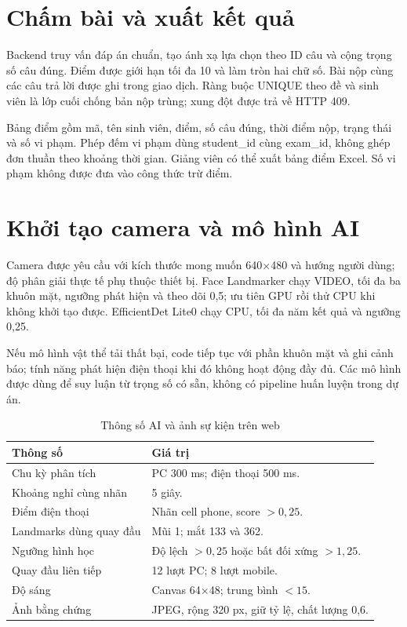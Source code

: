 \section{Chấm bài và xuất kết quả}
Backend truy vấn đáp án chuẩn, tạo ánh xạ lựa chọn theo ID câu và cộng trọng số câu đúng. Điểm được giới hạn tối đa 10 và làm tròn hai chữ số. Bài nộp cùng các câu trả lời được ghi trong giao dịch. Ràng buộc UNIQUE theo đề và sinh viên là lớp cuối chống bản nộp trùng; xung đột được trả về HTTP 409.

Bảng điểm gồm mã, tên sinh viên, điểm, số câu đúng, thời điểm nộp, trạng thái và số vi phạm. Phép đếm vi phạm dùng student\_id cùng exam\_id, không ghép đơn thuần theo khoảng thời gian. Giảng viên có thể xuất bảng điểm Excel. Số vi phạm không được đưa vào công thức trừ điểm.

\section{Khởi tạo camera và mô hình AI}
Camera được yêu cầu với kích thước mong muốn 640$\times$480 và hướng người dùng; độ phân giải thực tế phụ thuộc thiết bị. Face Landmarker chạy VIDEO, tối đa ba khuôn mặt, ngưỡng phát hiện và theo dõi 0,5; ưu tiên GPU rồi thử CPU khi không khởi tạo được. EfficientDet Lite0 chạy CPU, tối đa năm kết quả và ngưỡng 0,25.

Nếu mô hình vật thể tải thất bại, code tiếp tục với phần khuôn mặt và ghi cảnh báo; tính năng phát hiện điện thoại khi đó không hoạt động đầy đủ. Các mô hình được dùng để suy luận từ trọng số có sẵn, không có pipeline huấn luyện trong dự án.

\begin{table}[htbp]\centering
\caption{Thông số AI và ảnh sự kiện trên web}
\begin{tabularx}{\textwidth}{@{}L{6cm}X@{}}\toprule
Thông số & Giá trị \\\midrule
Chu kỳ phân tích & PC 300 ms; điện thoại 500 ms.\\
Khoảng nghỉ cùng nhãn & 5 giây.\\
Điểm điện thoại & Nhãn cell phone, score $>0{,}25$.\\
Landmarks dùng quay đầu & Mũi 1; mắt 133 và 362.\\
Ngưỡng hình học & Độ lệch $>0{,}25$ hoặc bất đối xứng $>1{,}25$.\\
Quay đầu liên tiếp & 12 lượt PC; 8 lượt mobile.\\
Độ sáng & Canvas 64$\times$48; trung bình $<15$.\\
Ảnh bằng chứng & JPEG, rộng 320 px, giữ tỷ lệ, chất lượng 0,6.\\
\bottomrule\end{tabularx}\end{table}

